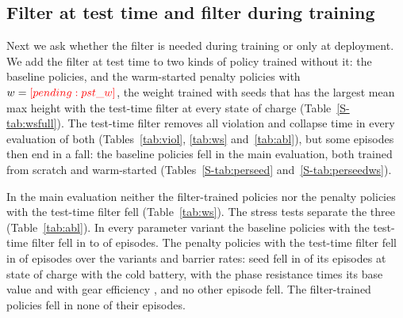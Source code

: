 \subsection{Filter at test time and filter during training}\label{sec:testtime}
Next we ask whether the filter is needed during training or only at deployment. We add the filter at test time to two kinds of policy trained without it: the baseline policies, and the warm-started penalty policies with $w=\res{pst_w}$, the weight trained with  seeds that has the largest mean max height with the test-time filter at every state of charge (Table~\ref{S-tab:wsfull}). The test-time filter removes all violation and collapse time in every evaluation of both (Tables~\ref{tab:viol}, \ref{tab:ws} and~\ref{tab:abl}), but some episodes then end in a fall: the baseline policies fell in the main evaluation, both trained from scratch and warm-started (Tables~\ref{S-tab:perseed} and~\ref{S-tab:perseedws}).
\begin{table}[tbp]\centering\caption{Stress tests of the warm-started policies, one row per setting: parameter variants (plant and filter alike, except current lag and gear efficiency, plant only), barrier rate $\gamma$ (base ), and model error of the true-state filter (estimation noise $\sigma$ on its $E$ and $R_0$, or the plant's $R_0$ scaled while the filter keeps the model's; filter-trained policies only, ``--''). Penalty $w=\res{pst_w}$ + test filter: the warm-started penalty policies with weight $w$, the filter added at test time.  seeds $\times$  episodes per state of charge. Violation times: largest over the states of charge of the mean over seeds (with the filter: largest of the times below $V_{\min}$, above $I_{\lim}$ and in collapse); falls: count over seeds and states of charge; filter active: mean over states of charge. Per policy, with hops, max height at every state of charge and infeasible time: Table~\ref{S-tab:ablfull} of the supplementary material.}\label{tab:abl}
\end{table}

In the main evaluation neither the filter-trained policies nor the penalty policies with the test-time filter fell (Table~\ref{tab:ws}). The stress tests separate the three (Table~\ref{tab:abl}). In every parameter variant the baseline policies with the test-time filter fell in  to  of  episodes. The penalty policies with the test-time filter fell in  of  episodes over the variants and barrier rates: seed  fell in  of its  episodes at state of charge  with the cold battery, with the phase resistance  times its base value and with gear efficiency , and no other episode fell. The filter-trained policies fell in none of their  episodes.

